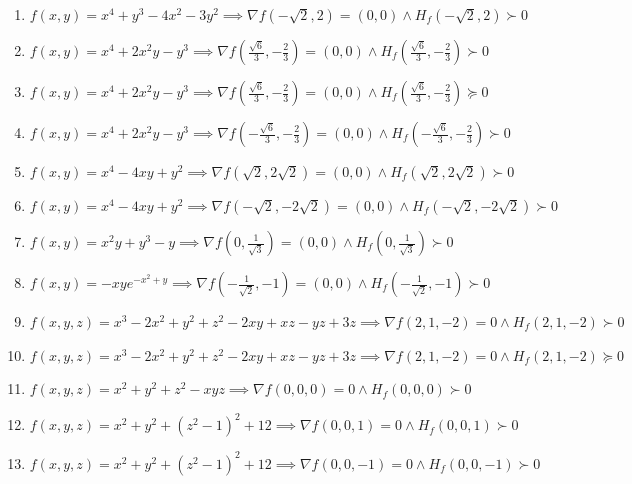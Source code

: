 \documentclass[11pt,a4paper]{article}
\begin{document}
\begin{enumerate}
\item $\displaystyle f(x, y) = x^{4} + y^{3} - 4x^{2} - 3y^{2} \implies \nabla f\left( -\sqrt{2}, 2 \right) = (0, 0) \land H_{f}\left( -\sqrt{2}, 2 \right) \succ 0$
\item $\displaystyle f(x, y) = x^{4} + 2x^{2} y - y^{3} \implies \nabla f\left( \frac{\sqrt{6}}{3}, -\frac{2}{3} \right) = (0, 0) \land H_{f}\left( \frac{\sqrt{6}}{3}, -\frac{2}{3} \right) \succ 0$
\item $\displaystyle f(x, y) = x^{4} + 2x^{2} y - y^{3} \implies \nabla f\left( \frac{\sqrt{6}}{3}, -\frac{2}{3} \right) = (0, 0) \land H_{f}\left( \frac{\sqrt{6}}{3}, -\frac{2}{3} \right) \succeq 0$
\item $\displaystyle f(x, y) = x^{4} + 2x^{2} y - y^{3} \implies \nabla f\left( -\frac{\sqrt{6}}{3}, -\frac{2}{3} \right) = (0, 0) \land H_{f}\left( -\frac{\sqrt{6}}{3}, -\frac{2}{3} \right) \succ 0$
\item $\displaystyle f(x, y) = x^{4} - 4xy + y^{2} \implies \nabla f\left( \sqrt{2}, 2\sqrt{2} \right) = (0, 0) \land H_{f}\left( \sqrt{2}, 2\sqrt{2} \right) \succ 0$
\item $\displaystyle f(x, y) = x^{4} - 4xy + y^{2} \implies \nabla f\left( -\sqrt{2}, -2\sqrt{2} \right) = (0, 0) \land H_{f}\left( -\sqrt{2}, -2\sqrt{2} \right) \succ 0$
\item $\displaystyle f(x, y) = x^{2} y + y^{3} - y \implies \nabla f\left( 0, \frac{1}{\sqrt{3}} \right) = (0, 0) \land H_{f}\left( 0, \frac{1}{\sqrt{3}} \right) \succ 0$
\item $\displaystyle f(x, y) = -xy e^{-x^{2} + y} \implies \nabla f\left( -\frac{1}{\sqrt{2}}, -1 \right) = (0, 0) \land H_{f}\left( -\frac{1}{\sqrt{2}}, -1 \right) \succ 0$
\item $\displaystyle f(x, y, z) = x^{3} - 2x^{2} + y^{2} + z^{2} - 2xy + xz - yz + 3z \implies \nabla f(2, 1, -2) = 0 \land H_{f}(2, 1, -2) \succ 0$
\item $\displaystyle f(x, y, z) = x^{3} - 2x^{2} + y^{2} + z^{2} - 2xy + xz - yz + 3z \implies \nabla f(2, 1, -2) = 0 \land H_{f}(2, 1, -2) \succeq 0$
\item $\displaystyle f(x, y, z) = x^{2} + y^{2} + z^{2} - xyz \implies \nabla f(0, 0, 0) = 0 \land H_{f}(0, 0, 0) \succ 0$
\item $\displaystyle f(x, y, z) = x^{2} + y^{2} + (z^{2} - 1)^{2} + 12 \implies \nabla f(0, 0, 1) = 0 \land H_{f}(0, 0, 1) \succ 0$
\item $\displaystyle f(x, y, z) = x^{2} + y^{2} + (z^{2} - 1)^{2} + 12 \implies \nabla f(0, 0, -1) = 0 \land H_{f}(0, 0, -1) \succ 0$

\end{enumerate}
\end{document}

